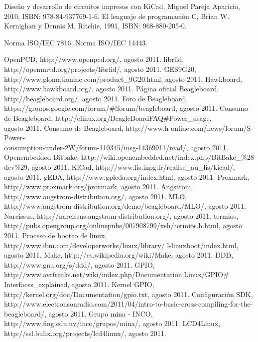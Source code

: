\begin{thebibliography}{200}
 Diseño y desarrollo de circuitos impresos con KiCad, Miguel Pareja Aparicio, 2010, ISBN: 978-84-937769-1-6.
\bibitem{} El lenguaje de programación C, Brian W. Kernighan y Dennis M. Ritchie, 1991, ISBN: 968-880-205-0.

 Norma ISO/IEC 7816.
 Norma ISO/IEC 14443.


 OpenPCD, http://www.openpcd.org/, agosto 2011.
 librfid, http://openmrtd.org/projects/librfid/, agosto 2011.
 GES9G20, http://www.glomationinc.com/product\_9G20.html, agosto 2011.
 Hawkboard, http://www.hawkboard.org/, agosto 2011.
 Página oficial Beagleboard, http://beagleboard.org/, agosto 2011.
 Foro de Beagleboard, https://groups.google.com/forum/\#!forum/beagleboard, agosto 2011.
 Consumo de Beagleboard, http://elinux.org/BeagleBoardFAQ\#Power\_usage, \\
agosto 2011.
 Consumo de Beagleboard, http://www.h-online.com/news/forum/S-Power-\\
consumption-under-2W/forum-110345/msg-14369911/read/, agosto 2011.
 Openembedded-Bitbake, http://wiki.openembedded.net/index.php/BitBake\_\%28
dev\%29, agosto 2011.
 KiCad, http://www.lis.inpg.fr/realise\_au\_lis/kicad/, agosto 2011.
 gEDA, http://www.gpleda.org/index.html, agosto 2011.
 Proxmark, http://www.proxmark.org/proxmark, agosto 2011.
 Angström, http://www.angstrom-distribution.org/, agosto 2011.
 MLO, http://www.angstrom-distribution.org/demo/beagleboard/MLO/, agosto 2011.
 Narcissus, http://narcissus.angstrom-distribution.org/, agosto 2011.
 termios, http://pubs.opengroup.org/onlinepubs/007908799/xsh/termios.h.html, agosto 2011.
 Proceso de booteo de linux, http://www.ibm.com/developerworks/linux/library/
l-linuxboot/index.html, agosto 2011.
 Make, http://es.wikipedia.org/wiki/Make, agosto 2011.
 DDD, http://www.gnu.org/s/ddd/, agosto 2011.
 GPIO, http://www.avrfreaks.net/wiki/index.php/Documentation:Linux/GPIO\#
Interfaces\_explained, agosto 2011.
 Kernel GPIO, http://kernel.org/doc/Documentation/gpio.txt, agosto 2011.
 Configuración SDK, http://www.electronsonradio.com/2011/04/intro-to-basic-cross-compiling-for-the-beagleboard/, agosto 2011.
 Grupo mina - INCO, http://www.fing.edu.uy/inco/grupos/mina/, agosto 2011.
 LCD4Linux, http://ssl.bulix.org/projects/lcd4linux/, agosto 2011.


\end{thebibliography}
